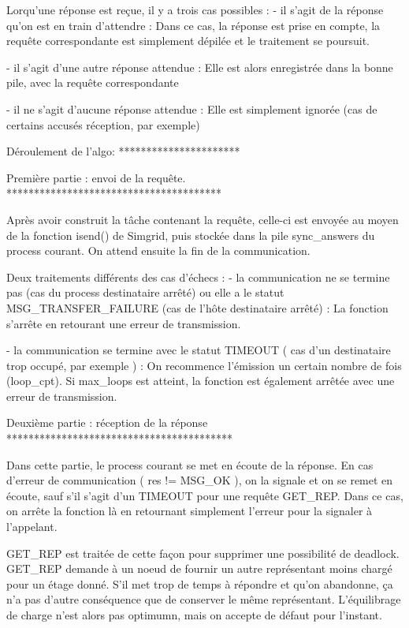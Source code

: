 Lorqu'une réponse est reçue, il y a trois cas possibles :
- il s'agit de la réponse qu'on est en train d'attendre :
  Dans ce cas, la réponse est prise en compte, la requête correspondante est simplement dépilée et
  le traitement se poursuit.

- il s'agit d'une autre réponse attendue :
  Elle est alors enregistrée dans la bonne pile, avec la requête correspondante

- il ne s'agit d'aucune réponse attendue :
  Elle est simplement ignorée (cas de certains accusés réception, par exemple)

Déroulement de l'algo:
**********************

Première partie : envoi de la requête.
***************************************

Après avoir construit la tâche contenant la requête, celle-ci est envoyée au moyen de la fonction
isend() de Simgrid, puis stockée dans la pile sync_answers du process courant.
On attend ensuite la fin de la communication.

Deux traitements différents des cas d'échecs :
- la communication ne se termine pas (cas du process destinataire arrêté) ou elle a le statut
  MSG_TRANSFER_FAILURE (cas de l'hôte destinataire arrêté) :
  La fonction s'arrête en retourant une erreur de transmission.

- la communication se termine avec le statut TIMEOUT ( cas d'un destinataire trop occupé, par
  exemple ) :
  On recommence l'émission un certain nombre de fois (loop_cpt).
  Si max_loops est atteint, la fonction est également arrêtée avec une erreur de transmission.


Deuxième partie : réception de la réponse
*****************************************

Dans cette partie, le process courant se met en écoute de la réponse. En cas d'erreur de communication
( res != MSG_OK ), on la signale et on se remet en écoute, sauf s'il s'agit d'un TIMEOUT pour une
requête GET_REP. Dans ce cas, on arrête la fonction là en retournant simplement l'erreur pour la
signaler à l'appelant.

GET_REP est traitée de cette façon pour supprimer une possibilité de deadlock. GET_REP demande à un
noeud de fournir un autre représentant moins chargé pour un étage donné. S'il met trop de temps à
répondre et qu'on abandonne, ça n'a pas d'autre conséquence que de conserver le même représentant.
L'équilibrage de charge n'est alors pas optimumn, mais on accepte de défaut pour l'instant.

